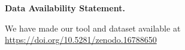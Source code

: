 \noindent \textbf{Data Availability Statement.}

\indent We have made our tool and dataset available at \url{https://doi.org/10.5281/zenodo.16788650}





